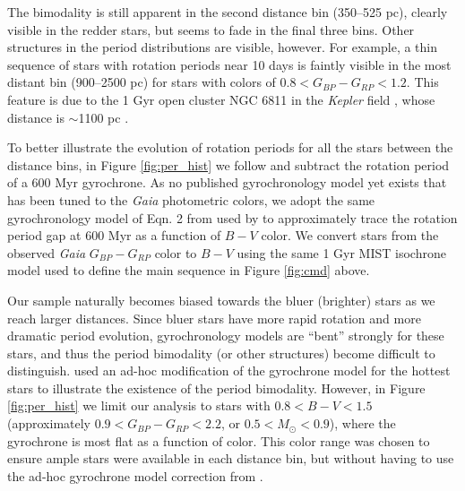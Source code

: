\documentclass[preprint2]{aastex62}
\newcommand{\Kepler}{\textsl{Kepler}\xspace}
\begin{document}
The bimodality is still apparent in the second distance bin (350--525 pc), clearly visible in the redder stars, but seems to fade in the final three bins. Other structures in the period distributions are visible, however. For example, a thin sequence of stars with rotation periods near 10 days is faintly visible in the most distant bin (900--2500 pc) for stars with colors of $0.8<G_{BP}-G_{RP}<1.2$. This feature is due to the 1 Gyr open cluster NGC 6811 in the \Kepler field \citep{meibom2011}, whose distance is $\sim$1100 pc \citep{sandquist2016}.



To better illustrate the evolution of rotation periods for all the stars between the distance bins, in Figure \ref{fig:per_hist} we follow \citet{davenport2017} and subtract the rotation period of a 600 Myr gyrochrone. As no published gyrochronology model yet exists that has been tuned to the {\em Gaia} photometric colors, we adopt the same gyrochronology model of Eqn. 2 from \citet{meibom2009} used by \citet{davenport2017} to approximately trace the rotation period gap at 600 Myr as a function of $B-V$ color. We convert stars from the observed {\em Gaia} $G_{BP}-G_{RP}$ color to $B-V$ using the same 1 Gyr MIST isochrone model used to define the main sequence in Figure \ref{fig:cmd} above. 

Our sample naturally becomes biased towards the bluer (brighter) stars as we reach larger distances. Since bluer stars have more rapid rotation and more dramatic period evolution, gyrochronology models are ``bent'' strongly for these stars, and thus the period bimodality (or other structures) become difficult to distinguish. \citet{davenport2017} used an ad-hoc modification of the gyrochrone model for the hottest stars to illustrate the existence of the period bimodality. However, in Figure \ref{fig:per_hist} we limit our analysis to stars with $0.8<B-V<1.5$ (approximately $0.9<G_{BP}-G_{RP}<2.2$, or $0.5<M_\odot< 0.9$), where the gyrochrone is most flat as a function of color. This color range was chosen to ensure ample stars were available in each distance bin, but without having to use the ad-hoc gyrochrone model correction from \citet{davenport2017}.
\end{document}
